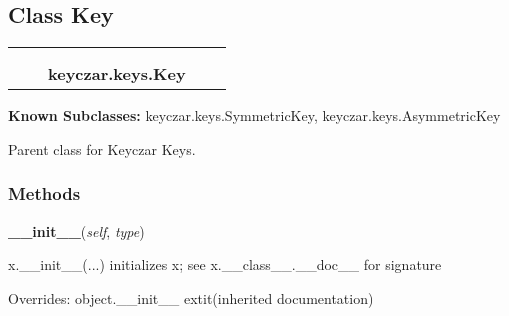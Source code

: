 
\subsection{Class Key}

    \label{keyczar:keys:Key}
\begin{tabular}{cccccc}
\multicolumn{2}{r}{\settowidth{\BCL}{object}\multirow{2}{\BCL}{object}}
&&
  \\\cline{3-3}
  &&\multicolumn{1}{c|}{}
&&
  \\
&&\multicolumn{2}{l}{\textbf{keyczar.keys.Key}}
\end{tabular}

\textbf{Known Subclasses:}
keyczar.keys.SymmetricKey,
    keyczar.keys.AsymmetricKey

Parent class for Keyczar Keys.



  \subsubsection{Methods}

    \vspace{0.5ex}

\hspace{.8\funcindent}\begin{boxedminipage}{\funcwidth}

    \raggedright \textbf{\_\_init\_\_}(\textit{self}, \textit{type})

\setlength{\parskip}{2ex}
    x.\_\_init\_\_(...) initializes x; see x.\_\_class\_\_.\_\_doc\_\_ for 
    signature

\setlength{\parskip}{1ex}
      Overrides: object.\_\_init\_\_ 	extit{(inherited documentation)}

    \end{boxedminipage}

    \label{keyczar:keys:Key:Header}

